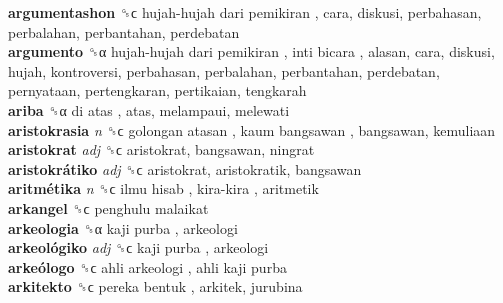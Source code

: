\textbf{argumentashon} ␝ϲ   hujah-hujah dari pemikiran , cara, diskusi, perbahasan, perbalahan, perbantahan, perdebatan  \\
\textbf{argumento} ␝α   hujah-hujah dari pemikiran ,  inti bicara , alasan, cara, diskusi, hujah, kontroversi, perbahasan, perbalahan, perbantahan, perdebatan, pernyataan, pertengkaran, pertikaian, tengkarah  \\
\textbf{ariba} ␝α   di atas , atas, melampaui, melewati  \\
\textbf{aristokrasia} \emph{n}  ␝ϲ   golongan atasan ,  kaum bangsawan , bangsawan, kemuliaan  \\
\textbf{aristokrat} \emph{adj}  ␝ϲ  aristokrat, bangsawan, ningrat  \\
\textbf{aristokrátiko} \emph{adj}  ␝ϲ  aristokrat, aristokratik, bangsawan  \\
\textbf{aritmétika} \emph{n}  ␝ϲ   ilmu hisab ,  kira-kira , aritmetik  \\
\textbf{arkangel} ␝ϲ   penghulu malaikat   \\
\textbf{arkeologia} ␝α   kaji purba , arkeologi  \\
\textbf{arkeológiko} \emph{adj}  ␝ϲ   kaji purba , arkeologi  \\
\textbf{arkeólogo} ␝ϲ   ahli arkeologi ,  ahli kaji purba   \\
\textbf{arkitekto} ␝ϲ   pereka bentuk , arkitek, jurubina  \\
